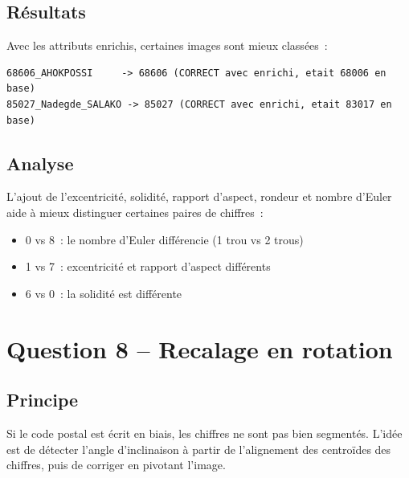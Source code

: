 \documentclass[a4paper,11pt]{article}
\begin{document}
\subsection{Résultats}

Avec les attributs enrichis, certaines images sont mieux classées~:

\begin{lstlisting}[style=output, caption={Améliorations avec les attributs enrichis.}]
68606_AHOKPOSSI     -> 68606 (CORRECT avec enrichi, etait 68006 en base)
85027_Nadegde_SALAKO -> 85027 (CORRECT avec enrichi, etait 83017 en base)
\end{lstlisting}

\subsection{Analyse}

L'ajout de l'excentricité, solidité, rapport d'aspect, rondeur et nombre d'Euler aide à mieux distinguer certaines paires de chiffres~:
\begin{itemize}
    \item 0 vs 8~: le nombre d'Euler différencie (1 trou vs 2 trous)
    \item 1 vs 7~: excentricité et rapport d'aspect différents
    \item 6 vs 0~: la solidité est différente
\end{itemize}


\section{Question 8 -- Recalage en rotation}

\subsection{Principe}

Si le code postal est écrit en biais, les chiffres ne sont pas bien segmentés. L'idée est de détecter l'angle d'inclinaison à partir de l'alignement des centroïdes des chiffres, puis de corriger en pivotant l'image.
\end{document}
